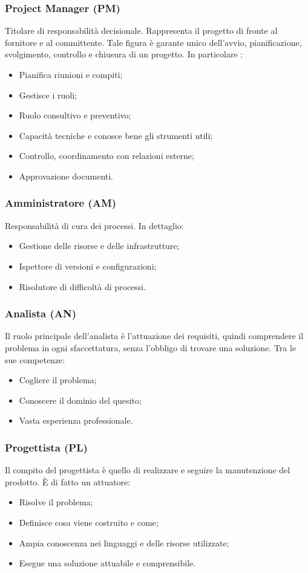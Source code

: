 \documentclass[12pt,a4paper,titlepage]{article}
\begin{document}
\subsubsection{Project Manager (PM)} 
Titolare di responsabilità decisionale. Rappresenta il progetto di fronte al fornitore e al committente. Tale figura è garante unico dell'avvio, pianificazione, svolgimento, controllo e chiusura di un progetto. In particolare :
\begin{itemize}
	\item Pianifica riunioni e compiti;
	\item Gestisce i ruoli;
	\item Ruolo consultivo e preventivo;
	\item Capacità tecniche e conosce bene gli strumenti utili;
	\item Controllo, coordinamento con relazioni esterne;
	\item Approvazione documenti.
\end{itemize}

\subsubsection{Amministratore (AM)} 
Responsabilità di cura dei processi. In dettaglio: 
\begin{itemize}
	\item Gestione delle risorse e delle infrastrutture;
	\item Ispettore di versioni e configurazioni;
	\item Risolutore di difficoltà di processi.
\end{itemize}

\subsubsection{Analista (AN)} 
Il ruolo principale dell'analista è l'attuazione dei requisiti, quindi comprendere il problema in ogni sfaccettatura, senza l'obbligo di trovare una soluzione. Tra le sue competenze: 
\begin{itemize}
	\item Cogliere il problema;
	\item Conoscere il dominio del quesito;
	\item Vasta esperienza professionale.
\end{itemize}

\subsubsection{Progettista (PL)} 
Il compito del progettista è quello di realizzare e seguire la manutenzione del prodotto. È di fatto un attuatore: 
\begin{itemize}
	\item Risolve il problema;
	\item Definisce cosa viene costruito e come;
	\item Ampia conoscenza nei linguaggi e delle risorse utilizzate;
	\item Esegue una soluzione attuabile e comprensibile.
\end{itemize}
\end{document}
